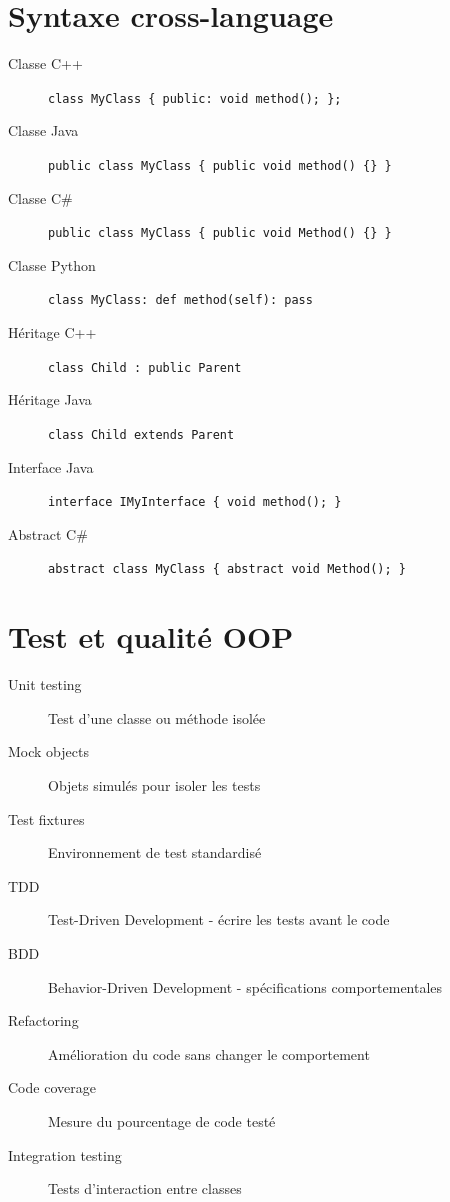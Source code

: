 \documentclass{article}
\begin{document}
\begin{multicols*}{3}
\section*{Syntaxe cross-language}
\begin{description}
\item[Classe C++] \texttt{class MyClass \{ public: void method(); \};}
\item[Classe Java] \texttt{public class MyClass \{ public void method() \{\} \}}
\item[Classe C\#] \texttt{public class MyClass \{ public void Method() \{\} \}}
\item[Classe Python] \texttt{class MyClass: def method(self): pass}
\item[Héritage C++] \texttt{class Child : public Parent}
\item[Héritage Java] \texttt{class Child extends Parent}
\item[Interface Java] \texttt{interface IMyInterface \{ void method(); \}}
\item[Abstract C\#] \texttt{abstract class MyClass \{ abstract void Method(); \}}
\end{description}

\section*{Test et qualité OOP}
\begin{description}
\item[Unit testing] Test d'une classe ou méthode isolée
\item[Mock objects] Objets simulés pour isoler les tests
\item[Test fixtures] Environnement de test standardisé
\item[TDD] Test-Driven Development - écrire les tests avant le code
\item[BDD] Behavior-Driven Development - spécifications comportementales
\item[Refactoring] Amélioration du code sans changer le comportement
\item[Code coverage] Mesure du pourcentage de code testé
\item[Integration testing] Tests d'interaction entre classes
\end{description}


\end{multicols*}
\end{document}
